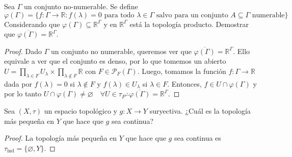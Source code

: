 \documentclass{article}
\theoremstyle{plain}
\theoremstyle{definition}
\newcommand{\R}{\mathbb{R}}
\newcommand{\cl}[1]{\overline{#1}}              %
\newcommand{\pf}{\mathcal{P}_F}                 %
\newenvironment{ejercicio}[1]{\begin{trivlist}
\item[\hskip \labelsep {\bfseries Ejercicio}\hskip \labelsep {\bfseries #1.}]}{\end{trivlist}}
\begin{document}
\begin{ejercicio}{5}
    Sea \( \Gamma \) un conjunto no-numerable. Se define
    \[
        \varphi(\Gamma) = \{ f : \Gamma \to \R : f(\lambda) = 0 \text{ para todo } \lambda \in \Gamma \text{ salvo para un conjunto } A \subseteq \Gamma \text{ numerable} \}
    \]
    Considerando que \( \varphi(\Gamma) \subseteq \R^{\Gamma} \) y en \( \R^{\Gamma} \) está la topología producto. Demostrar que \( \cl{\varphi(\Gamma)} = \R^{\Gamma} \).
\end{ejercicio}
\begin{proof}
    Dado \( \Gamma \) un conjunto no numerable, queremos ver que \( \cl{\varphi(\Gamma)} = \R^\Gamma \). Ello equivale a ver que el conjunto es denso, por lo que tomemos
    un abierto \( U = \prod_{\lambda \in F} U_\lambda \times \prod_{\lambda \notin F} \R \) con \( F \in \pf{(\Gamma)} \).
    Luego, tomamos la función \( f : \Gamma \to \R \) dada por \( f(\lambda) = 0 \) si \( \lambda \notin F \) y \( f(\lambda) \in U_\lambda \) si \( \lambda \in F \). Entonces, \( f \in U \cap \varphi(\Gamma) \) y por lo tanto \( U \cap \varphi(\Gamma) \neq \varnothing \quad \forall U \in \tau_P \therefore \cl{\varphi(\Gamma)} = \R^\Gamma \).
\end{proof}

\begin{ejercicio}{6}
    Sea \( (X, \tau) \) un espacio topológico y \( g : X \to Y \) suryectiva. ¿Cuál es la topología más pequeña en \( Y \) que hace que \( g \) sea continua?
\end{ejercicio}
\begin{proof}
    La topología más pequeña en \( Y \) que hace que \( g \) sea continua es \( \tau_{\text{ind}} = \{ \varnothing, Y \} \).
\end{proof}
\end{document}
